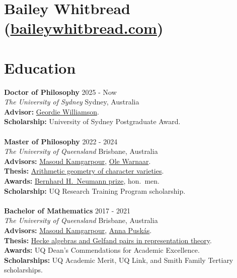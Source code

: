 \documentclass[8pt]{amsart}
\begin{document}
\section*{
{\LARGE Bailey Whitbread} \\ 
(\href{https://www.baileywhitbread.com}{baileywhitbread.com})
}










\section*{\LARGE Education}
\textbf{Doctor of Philosophy} \hfill 2025 - Now  \\
\emph{The University of Sydney} \hfill Sydney, Australia \\
\textbf{Advisor:} \href{https://www.maths.usyd.edu.au/u/geordie/}{Geordie Williamson}. \\
\textbf{Scholarship:} University of Sydney Postgraduate Award. \\
\ \\
\textbf{Master of Philosophy} \hfill 2022 - 2024 \\
\emph{The University of Queensland} \hfill Brisbane, Australia \\
\textbf{Advisors:} \href{https://sites.google.com/site/masoudkomi/home}{Masoud Kamgarpour}, \href{https://people.smp.uq.edu.au/OleWarnaar/}{Ole Warnaar}. \\
\textbf{Thesis:} \href{https://baileywhitbread.com/files/24_mphil_thesis.pdf}{Arithmetic geometry of character varieties}. \\
\textbf{Awards:} \href{https://austms.org.au/award-and-grant/the-b-h-neumann-prize/}{
Bernhard H.\ Neumann prize}, hon.\ men. \\
\textbf{Scholarship:} UQ Research Training Program scholarship. \\
\ \\
\textbf{Bachelor of Mathematics} \hfill 2017 - 2021 \\
\emph{The University of Queensland} \hfill Brisbane, Australia \\
\textbf{Advisors:} \href{https://sites.google.com/site/masoudkomi/home}{Masoud Kamgarpour}, \href{https://people.smp.uq.edu.au/AnnaPuskas/}{Anna Puskás}. \\
\textbf{Thesis:} \href{https://baileywhitbread.com/files/21_honours_thesis.pdf}{Hecke algebras and Gelfand pairs in representation theory}. \\
\textbf{Awards:} UQ Dean's Commendations for Academic Excellence. \\
\textbf{Scholarships:} UQ Academic Merit, UQ Link, and Smith Family Tertiary scholarships. 
\end{document}
